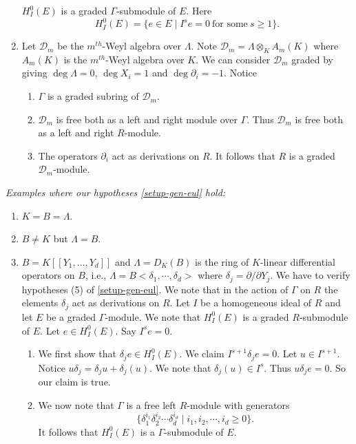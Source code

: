 \documentclass{amsart}
\newcommand{\D}{\mathcal{D} }
\theoremstyle{plain}
\theoremstyle{definition}
\theoremstyle{remark}
\begin{document}
\begin{enumerate}
$H^0_I(E)$ is a graded $\Gamma$-submodule of $E$. Here
\[
 H^0_I(E) = \{ e \in E \mid I^s e = 0 \ \text{for some} \ s \geq 1 \}.
\]
\item
Let $\D_m$ be the $m^{th}$-Weyl algebra over $\Lambda$. Note $\D_m = \Lambda \otimes_K A_m(K)$ where $A_m(K)$ is the $m^{th}$-Weyl algebra
over $K$. We can consider $\D_m$ graded by giving
$\deg \Lambda = 0$, $\deg X_i = 1$ and $\deg \partial_i = -1$. Notice
\begin{enumerate}
 \item $\Gamma$ is a graded subring of $\D_m$.
 \item $\D_m$ is free both as a left and right module over $\Gamma$. Thus $\D_m$ is free both as a left and right  $R$-module.
 \item The operators $\partial_i$ act as derivations on $R$. It follows that $R$ is a graded $\D_m$-module.
\end{enumerate}
\end{enumerate}


\s \label{ex-gen-eul} \textit{Examples where our hypotheses \ref{setup-gen-eul} hold:} 

\begin{enumerate}
 \item $K = B = \Lambda$.
 \item $B \neq K$ but $\Lambda = B$.
 \item $B = K[[Y_1,\ldots, Y_d]]$ and  $\Lambda = D_K(B)$ is the ring of $K$-linear differential operators on $B$, i.e.,
 $\Lambda = B<\delta_1, \cdots, \delta_d>$ where $\delta_j = \partial/\partial Y_j$. We have to verify hypotheses (5) of \ref{setup-gen-eul}.
 We note that in the action of $\Gamma$ on $R$ the elements $\delta_j$ act as derivations on $R$.
 Let $I$ be a homogeneous ideal of $R$ and let $E$ be a graded $\Gamma$-module. We note that
 $H^0_I(E)$ is a graded $R$-submodule
 of $E$. Let $e \in H^0_I(E)$. Say $I^s e = 0$.
 \begin{enumerate}
  \item We first show that $\delta_j e \in H^0_I(E)$. We claim $I^{s+1}\delta_j e = 0$. Let $u \in I^{s+1}$. Notice
  $u \delta_j = \delta_j u + \delta_j(u)$. We note that $\delta_j(u) \in I^s$. Thus $u \delta_j e = 0$. So
  our claim is true.
  \item
  We now note that $\Gamma$ is a free left $R$-module with generators 
  $$\{ \delta_1^{i_1} \delta_2^{i_2} \cdots \delta_d^{i_d} \mid i_1,i_2, \cdots, i_d \geq 0 \}.$$
  It follows that $H^0_I(E)$ is a $\Gamma$-submodule of $E$.
 \end{enumerate}

\end{enumerate}
\end{document}
